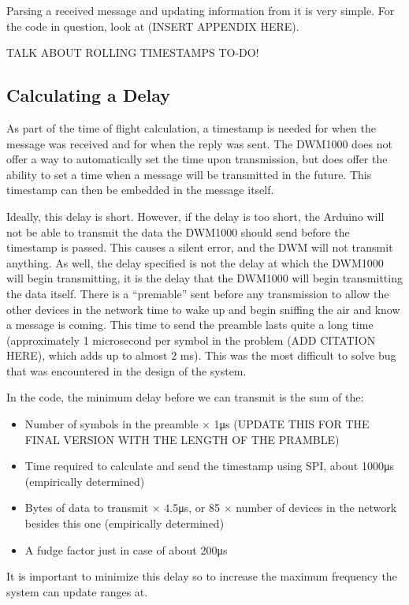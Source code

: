 Parsing a received message and updating information from it is very simple. For the code in question, look at (INSERT APPENDIX HERE).

TALK ABOUT ROLLING TIMESTAMPS TO-DO!

\subsection{Calculating a Delay}
As part of the time of flight calculation, a timestamp is needed for when the message was received and for when the reply was sent. The DWM1000 does not offer a way to automatically set the time upon transmission, but does offer the ability to set a time when a message will be transmitted in the future. This timestamp can then be embedded in the message itself.

Ideally, this delay is short. However, if the delay is too short, the Arduino will not be able to transmit the data the DWM1000 should send before the timestamp is passed. This causes a silent error, and the DWM will not transmit anything. As well, the delay specified is not the delay at which the DWM1000 will begin transmitting, it is the delay that the DWM1000 will begin transmitting the data itself. There is a ``premable'' sent before any transmission to allow the other devices in the network time to wake up and begin sniffing the air and know a message is coming. This time to send the preamble lasts quite a long time (approximately 1 microsecond per symbol in the problem (ADD CITATION HERE), which adds up to almost 2 ms). This was the most difficult to solve bug that was encountered in the design of the system.

In the code, the minimum delay before we can transmit is the sum of the:
\begin{itemize}
	\item Number of symbols in the preamble $\times$ 1\si{\micro\second} (UPDATE THIS FOR THE FINAL VERSION WITH THE LENGTH OF THE PRAMBLE)
	\item Time required to calculate and send the timestamp using SPI, about 1000\si{\micro\second} (empirically determined)
	\item Bytes of data to transmit $\times$ 4.5\si{\micro\second}, or 85 $\times$ number of devices in the network besides this one (empirically determined)
	\item A fudge factor just in case of about 200\si{\micro\second}
\end{itemize}

It is important to minimize this delay so to increase the maximum frequency the system can update ranges at.

